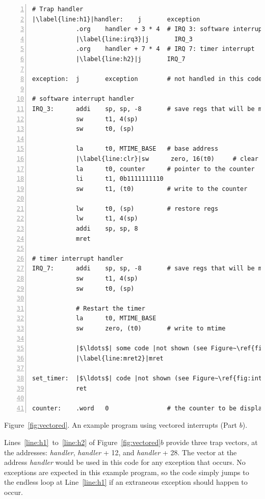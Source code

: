 \documentclass[11pt, twoside, pdftex]{article}
\begin{document}
\begin{center}
\begin{minipage}[h]{15 cm}
\begin{lstlisting}[style=defaultNiosVStyle, name=vecs, numbers=left, escapechar=|]
# Trap handler
|\label{line:h1}|handler:    j       exception
            .org    handler + 3 * 4  # IRQ 3: software interrupt
            |\label{line:irq3}|j       IRQ_3
            .org    handler + 7 * 4  # IRQ 7: timer interrupt
            |\label{line:h2}|j       IRQ_7

exception:  j       exception        # not handled in this code
            
# software interrupt handler
IRQ_3:      addi    sp, sp, -8       # save regs that will be modified
            sw      t1, 4(sp)
            sw      t0, (sp)

            la      t0, MTIME_BASE   # base address
            |\label{line:clr}|sw      zero, 16(t0)     # clear software interrupt in msip
            la      t0, counter      # pointer to the counter
            li      t1, 0b1111111110
            sw      t1, (t0)         # write to the counter

            lw      t0, (sp)         # restore regs
            lw      t1, 4(sp)
            addi    sp, sp, 8
            mret

# timer interrupt handler
IRQ_7:      addi    sp, sp, -8       # save regs that will be modified
            sw      t1, 4(sp)
            sw      t0, (sp)
            
            # Restart the timer
            la      t0, MTIME_BASE
            sw      zero, (t0)       # write to mtime

            |$\ldots$| some code |not shown (see Figure~\ref{fig:ints})|
            |\label{line:mret2}|mret

set_timer:  |$\ldots$| code |not shown (see Figure~\ref{fig:ints})|
            ret

counter:    .word   0                # the counter to be displayed
\end{lstlisting}

\vspace{0.25in}
Figure~\ref{fig:vectored}.	An example program using vectored interrupts (Part $b$).
\end{minipage}
\end{center}

Lines~\ref{line:h1}~to~\ref{line:h2} of Figure~\ref{fig:vectored}$b$ provide three
trap vectors, at the addresses: {\it handler}, {\it handler} + 12, and {\it handler} + 28.
The vector at the address {\it handler} would be used in this code for any exception that
occurs. No exceptions are expected in this example program, so the code simply jumps to the
endless loop at Line~\ref{line:h1} if an extraneous exception should happen to occur. 
\end{document}
